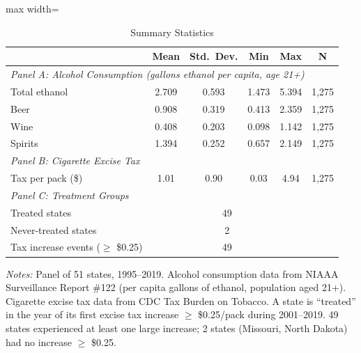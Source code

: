\begin{table}[H]
\centering
\caption{Summary Statistics}
\label{tab:summary}
\begin{threeparttable}
\begin{adjustbox}{max width=\textwidth}
\begin{tabular}{lccccc}
\toprule
 & Mean & Std.\ Dev. & Min & Max & N \\
\midrule
\multicolumn{6}{l}{\textit{Panel A: Alcohol Consumption (gallons ethanol per capita, age 21+)}} \\
Total ethanol & 2.709 & 0.593 & 1.473 & 5.394 & 1,275 \\
Beer & 0.908 & 0.319 & 0.413 & 2.359 & 1,275 \\
Wine & 0.408 & 0.203 & 0.098 & 1.142 & 1,275 \\
Spirits & 1.394 & 0.252 & 0.657 & 2.149 & 1,275 \\
\midrule
\multicolumn{6}{l}{\textit{Panel B: Cigarette Excise Tax}} \\
Tax per pack (\$) & 1.01 & 0.90 & 0.03 & 4.94 & 1,275 \\
\midrule
\multicolumn{6}{l}{\textit{Panel C: Treatment Groups}} \\
Treated states & \multicolumn{4}{c}{49} & \\
Never-treated states & \multicolumn{4}{c}{2} & \\
Tax increase events ($\geq$ \$0.25) & \multicolumn{4}{c}{49} & \\
\bottomrule
\end{tabular}
\end{adjustbox}
\begin{tablenotes}[flushleft]
\small
\item \textit{Notes:} Panel of 51 states, 1995--2019. Alcohol consumption data from NIAAA Surveillance Report \#122 (per capita gallons of ethanol, population aged 21+). Cigarette excise tax data from CDC Tax Burden on Tobacco. A state is ``treated'' in the year of its first excise tax increase $\geq$ \$0.25/pack during 2001--2019. 49 states experienced at least one large increase; 2 states (Missouri, North Dakota) had no increase $\geq$ \$0.25.
\end{tablenotes}
\end{threeparttable}
\end{table}
